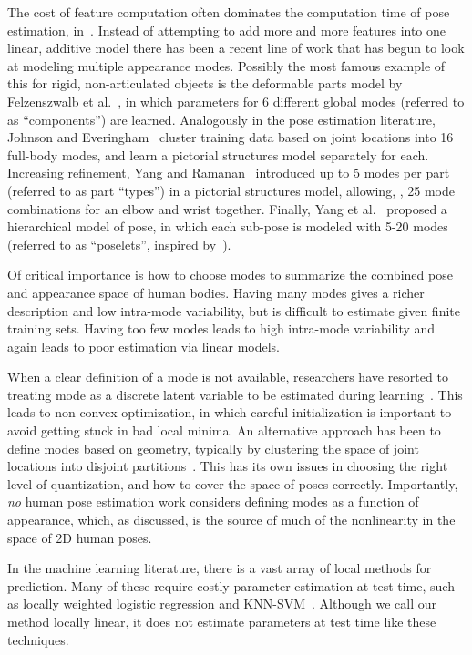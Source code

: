  The cost of feature computation often 
dominates the computation time of pose estimation, \eg 
in~\citep{devacrf,sapp2010}.  Instead of attempting to add more and more 
features into one linear, additive model there has been a recent line of work 
that has begun to look at modeling multiple appearance modes.  Possibly the 
most famous example of this for rigid, non-articulated objects is the 
deformable parts model by Felzenszwalb et al.~\citep{dpm}, in which parameters 
for 6 different global modes (referred to as ``components'') are learned.  
Analogously in the pose estimation literature, Johnson and 
Everingham~\citep{johnson11} cluster training data based on joint locations into 
16 full-body modes, and learn a pictorial structures model separately for each.  
Increasing refinement, Yang and Ramanan~\citep{deva2011} introduced up to 5 
modes per part (referred to as part ``types'') in a pictorial structures model, 
allowing, \eg, 25 mode combinations for an elbow and wrist together.  Finally, 
Yang et al.~\citep{wang2011} proposed a hierarchical model of pose, in which 
each sub-pose is modeled with 5-20 modes (referred to as ``poselets'', inspired 
by~\citep{bourdev09}).

Of critical importance is how to choose modes to summarize the combined pose 
and appearance space of human bodies.  Having many modes gives a richer 
description and low intra-mode variability, but is difficult to estimate given 
finite training sets.  Having too few modes leads to high intra-mode 
variability and again leads to poor estimation via linear models. 

When a clear definition of a mode is not available, researchers have resorted 
to treating mode as a discrete latent variable to be estimated during 
learning~\citep{dpm,deva2011}.  This leads to non-convex optimization, in which 
careful initialization is important to avoid getting stuck in bad local minima.  
An alternative approach has been to define modes based on geometry, typically 
by clustering the space of joint locations into disjoint 
partitions~\citep{johnson11,wang2011}.  This has its own issues in choosing the 
right level of quantization, and how to cover the space of poses correctly.  
Importantly, {\em no} human pose estimation work considers defining modes as a 
function of appearance, which, as discussed, is the source of much of the 
nonlinearity in the space of 2D human poses. 

In the machine learning literature, there is a vast array of local methods for 
prediction.  Many of these require costly parameter estimation at test time, 
such as locally weighted logistic regression and KNN-SVM~\citep{zhang06}.  
Although we call our method locally linear, it does not estimate parameters at 
test time like these techniques.

